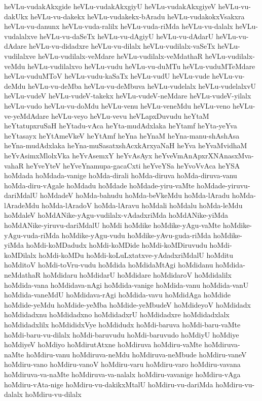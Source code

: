 {heVLu-vudakAkxgide
heVLu-vudakAkxgiyU
heVLu-vudakAkxgiyeV
heVLu-vu-dakUkx
heVLu-vu-dakekx
heVLu-vudakekx-bAradu
heVLu-vudakokxVsakxra
heVLu-vu-danunx
heVLu-vuda-ralilx
heVLu-vuda-riMda
heVLu-vu-dalalx
heVLu-vudalalxve
heVLu-vu-daSeTx
heVLu-vu-dAgiyU
heVLu-vu-dAdarU
heVLu-vu-dAdare
heVLu-vu-didadxre
heVLu-vu-dilalx
heVLu-vudilalx-vaSeTx
heVLu-vudilalxve
heVLu-vudilalx-veMdare
heVLu-vudilalx-veMdathaR
heVLu-vudilalx-veMdu
heVLu-vudilalxvo
heVLu-vudu
heVLu-vu-duMTu
heVLu-vuduMTeMdare
heVLu-vuduMToV
heVLu-vudu-kaSaTx
heVLu-vudU
heVLu-vude
heVLu-vu-deMdu
heVLu-vu-deMba
heVLu-vu-deMbuva
heVLu-vudelalx
heVLu-vudelalxvU
heVLu-vudeV
heVLu-vudeV-takekx
heVLu-vudeV-neMdare
heVLu-vudeV-yilalx
heVLu-vudo
heVLu-vu-doMdu
heVLu-venu
heVLu-veneMdu
heVLu-veno
heVLu-ve-yeMdAdare
heVLu-veyo
heVLu-vevu
heVLapxDuvudu
heYtaM
heYtatupxruSaH
heYtadu-vAca
heYta-mudAdxlaka
heYtamf
heYta-yeYva
heYtasayx
heYtAmeVkeV
heYtAmf
heYna
heYnaM
heYna-manu-shAshAsa
heYna-mudAdxlaka
heYna-muSasatxshAcxkArxyaNaH
heYva
heYvaMvidhaM
heYvAsimxMlolxVka
heYvAsemxY
heYvAsAyx
heYveVmAnApxrXNAnasxMva-vahaR
heYveYteV
heYveYnamupa-gacaCxti
heYveYSa
heYvoVvAca
heYSA
hoMdada
hoMdada-vanige
hoMda-dirali
hoMda-diruva
hoMda-diruva-vanu
hoMda-diru-vAgale
hoMdadu
hoMdade
hoMdade-yiru-vaMte
hoMdade-yiruvu-dariMdalU
hoMdadeV
hoMda-bahudu
hoMda-beVkeMdu
hoMda-lAradu
hoMda-lAradeMdu
hoMda-lAradoV
hoMda-lAravu
hoMdali
hoMdalu
hoMda-leMdu
hoMdaleV
hoMdANike-yAgu-vudilalx-vAdadxriMda
hoMdANike-yiMda
hoMdANike-yiruvu-dariMdalU
hoMdi
hoMdike
hoMdike-yAgu-vaMte
hoMdike-yAgu-vuda-riMda
hoMdike-yAgu-vudu
hoMdike-yAvu-guda-riMda
hoMdike-yiMda
hoMdi-koMDadudx
hoMdi-koMDide
hoMdi-koMDiruvudu
hoMdi-koMDilalx
hoMdi-koMDu
hoMdi-koLuLxtatxve-yAdadxriMdalU
hoMditu
hoMditoV
hoMdi-toVru-vudu
hoMdida
hoMdidaMtAgi
hoMdidanu
hoMdida-neMdathaR
hoMdidaru
hoMdidarU
hoMdidare
hoMdidaroV
hoMdidalilx
hoMdida-vana
hoMdidava-nAgi
hoMdida-vanige
hoMdida-vanu
hoMdida-vanU
hoMdida-vaneMdU
hoMdidava-rAgi
hoMdida-vavu
hoMdidAga
hoMdide
hoMdide-yeMdu
hoMdide-yeMba
hoMdide-yeMbudeV
hoMdideyoV
hoMdidadx
hoMdidadxnu
hoMdidadxno
hoMdidadxrU
hoMdidadxre
hoMdidadxlalx
hoMdidadxlilx
hoMdididxVye
hoMdidudx
hoMdi-baruva
hoMdi-baru-vaMte
hoMdi-baru-vu-dilalx
hoMdi-baruvudu
hoMdi-baruvudo
hoMdiyU
hoMdiye
hoMdiyeV
hoMdiyo
hoMdirutAtxne
hoMdiruva
hoMdiru-vaMte
hoMdiruva-naMte
hoMdiru-vanu
hoMdiruva-neMdu
hoMdiruva-neMbude
hoMdiru-vaneV
hoMdiru-vano
hoMdiru-vanoV
hoMdiru-varu
hoMdiru-varo
hoMdiru-vavana
hoMdiruva-va-naMte
hoMdiruva-va-nalalx
hoMdiru-vavanige
hoMdiru-vAga
hoMdiru-vAta-nige
hoMdiru-vu-dakikxMtalU
hoMdiru-vu-dariMda
hoMdiru-vu-dalalx
hoMdiru-vu-dilalx
}
